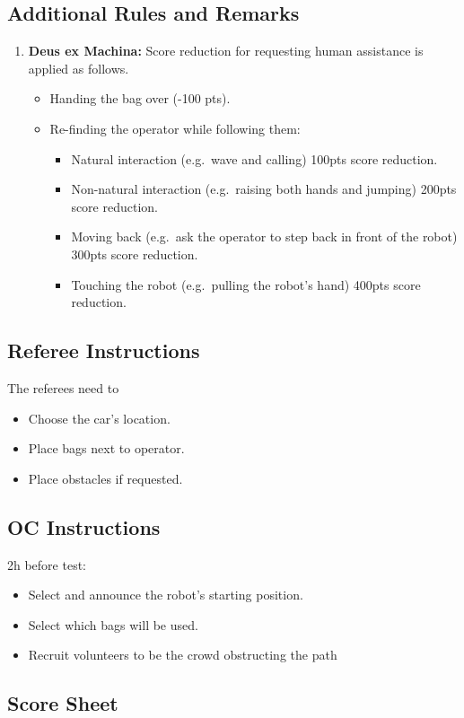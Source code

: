 \subsection*{Additional Rules and Remarks}
\begin{enumerate}[nosep]
	\item \textbf{Deus ex Machina:} Score reduction for requesting human assistance is applied as follows.
	\begin{itemize}[nosep]

\item Handing the bag over (-100 pts).
\item Re-finding the operator while following them:
		\begin{itemize}[nosep]
		\item Natural interaction (e.g.~wave and calling) 100pts score reduction.
		\item Non-natural interaction (e.g.~raising both hands and jumping) 200pts score reduction.
		 		\item Moving back (e.g.~ask the operator to step back in front of the robot) 300pts score reduction.
		\item Touching the robot (e.g.~pulling the robot's hand) 400pts score reduction.
		\end{itemize}
	\end{itemize}
\end{enumerate}


\subsection*{Referee Instructions}
The referees need to
\begin{itemize}[nosep]
	\item Choose the car's location.
	\item Place bags next to operator.
	\item Place obstacles if requested.
\end{itemize}


\subsection*{OC Instructions}
2h before test:
\begin{itemize}[nosep]
	\item Select and announce the robot's starting position.
	\item Select which bags will be used.
	\item Recruit volunteers to be the crowd obstructing the path
\end{itemize}





\subsection*{Score Sheet}

